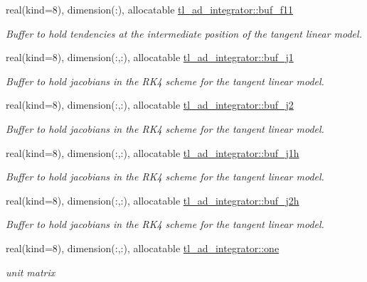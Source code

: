 \begin{DoxyCompactItemize}
real(kind=8), dimension(\+:), allocatable \hyperlink{namespacetl__ad__integrator_ad772309f6a78f335766cec48e65747ba}{tl\+\_\+ad\+\_\+integrator\+::buf\+\_\+f11}
\begin{DoxyCompactList}\small\item\em Buffer to hold tendencies at the intermediate position of the tangent linear model. \end{DoxyCompactList}\item 
real(kind=8), dimension(\+:,\+:), allocatable \hyperlink{namespacetl__ad__integrator_abf7d3c46036ca20cca151adc20a2fa14}{tl\+\_\+ad\+\_\+integrator\+::buf\+\_\+j1}
\begin{DoxyCompactList}\small\item\em Buffer to hold jacobians in the R\+K4 scheme for the tangent linear model. \end{DoxyCompactList}\item 
real(kind=8), dimension(\+:,\+:), allocatable \hyperlink{namespacetl__ad__integrator_a0ce53a275fcb35f76e2b34ee8d8df1ca}{tl\+\_\+ad\+\_\+integrator\+::buf\+\_\+j2}
\begin{DoxyCompactList}\small\item\em Buffer to hold jacobians in the R\+K4 scheme for the tangent linear model. \end{DoxyCompactList}\item 
real(kind=8), dimension(\+:,\+:), allocatable \hyperlink{namespacetl__ad__integrator_a4ae89c821542838ecfc5ac3b7a76d5c1}{tl\+\_\+ad\+\_\+integrator\+::buf\+\_\+j1h}
\begin{DoxyCompactList}\small\item\em Buffer to hold jacobians in the R\+K4 scheme for the tangent linear model. \end{DoxyCompactList}\item 
real(kind=8), dimension(\+:,\+:), allocatable \hyperlink{namespacetl__ad__integrator_a2a5e4cbc6f573f1274e53cbb4607f5bb}{tl\+\_\+ad\+\_\+integrator\+::buf\+\_\+j2h}
\begin{DoxyCompactList}\small\item\em Buffer to hold jacobians in the R\+K4 scheme for the tangent linear model. \end{DoxyCompactList}\item 
real(kind=8), dimension(\+:,\+:), allocatable \hyperlink{namespacetl__ad__integrator_a08f375467a942d0ad466b407a8007a7e}{tl\+\_\+ad\+\_\+integrator\+::one}
\begin{DoxyCompactList}\small\item\em unit matrix \end{DoxyCompactList}\end{DoxyCompactItemize}
